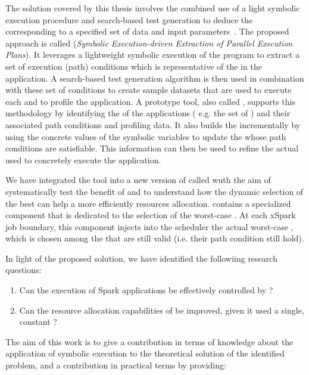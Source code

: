 The solution covered by this thesis involves the combined use of a light symbolic execution procedure and search-based test generation to deduce the \plan corresponding to a specified set of data and input parameters~\cite{Baresi-Quattrocchi-Denaro:2019}. The proposed approach is called \dSymb (\textit{Symbolic Execution-driven Extraction of Parallel Execution Plans}).  It leverages a lightweight symbolic execution of the program to extract a set of execution (path) conditions which is representative of the \plans in the application. A search-based test generation algorithm is then used in combination with these set of conditions to create sample datasets that are used to execute each \plan and to profile the application. A prototype tool, also called \dSymb, supports this methodology by identifying the \model of the applications ( e.g. the set of \plans) and their associated path conditions and profiling data. It also builds the \model incrementally by using the concrete values of the symbolic variables to update the \plans whose path conditions are satisfiable. This information can then be used to refine the actual \plan used to concretely execute the application. 

We have integrated the tool into a new version of \cSpark called \tool wuth the aim of systematically test the benefit of \dSymb and to understand how the dynamic selection of the best \plan can help a more efficiently resources allocation. \tool contains a specialized   component that is dedicated to the selection of the worst-case \plan. At each xSpark job boundary, this component injects into the \cSpark scheduler the actual worst-case \plan, which is chosen among the \plans that are still valid (i.e. their path condition still hold). 

In light of the proposed solution, we have identified the followiing research questions:

\begin{enumerate}[\boldmath$RQ_1 : $] 
	\item Can the execution of Spark applications be effectively controlled by \dSymb?
	\item Can the resource allocation capabilities of \cSpark be improved, given it used a single, constant \plan?
\end{enumerate}

 The aim of this work is to give a contribution in terms of knowledge about the application of symbolic execution to the theoretical solution of the identified  problem, and a contribution in practical terms by providing: 
 
